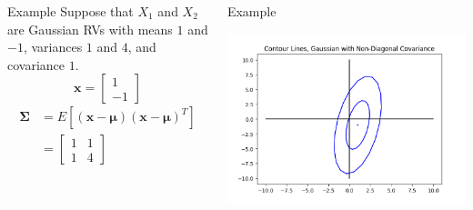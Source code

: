 \documentclass{beamer}
\begin{document}
\begin{frame}
  \begin{columns}
    \column{2.25in}
    \begin{block}{Example}
      Suppose that $X_1$ and $X_2$ are Gaussian RVs with means $1$ and
      $-1$, variances $1$ and $4$, and covariance $1$.
      \begin{displaymath}
        \mathbf{x}=\left[\begin{array}{c}1\\-1\end{array}\right]
      \end{displaymath}
      \begin{align*}
        \bm{\Sigma}&=E\left[(\mathbf{x}-\bm{\mu})(\mathbf{x}-\bm{\mu})^T\right]\\
        &=\left[\begin{array}{cc}1&1\\1&4\end{array}\right]
      \end{align*}
    \end{block}
    \column{2in}
    \begin{block}{Example}
      \centerline{\includegraphics[width=\textwidth]{figs/covariance_example.png}}
    \end{block}
  \end{columns}    
\end{frame}
\end{document}
